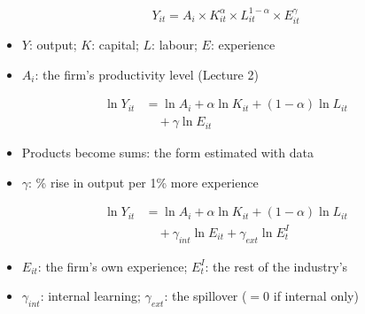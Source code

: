 \documentclass{beamer}
\begin{document}
\begin{frame}[plain,label=w3_production]
  \Large
  \[
    \tag{20}\;Y_{it} = A_i \times K_{it}^{\alpha} \times L_{it}^{1-\alpha} \times E_{it}^{\gamma}
  \]
  \vspace{0.3em}
  \begin{itemize}\Large
    \item $Y$: output; $K$: capital; $L$: labour; $E$: experience
    \item $A_i$: the firm's productivity level (Lecture 2)
  \end{itemize}
\end{frame}

\begin{frame}[plain,label=w3_production_log]
  \Large
  \begin{align*}
    \tag{21}\;\ln Y_{it} &= \ln A_i + \alpha \ln K_{it} + (1-\alpha) \ln L_{it}\\
                         &\quad + \gamma \ln E_{it}
  \end{align*}
  \vspace{0.2em}
  \begin{itemize}\Large
    \item Products become sums: the form estimated with data
    \item $\gamma$: \% rise in output per 1\% more experience
  \end{itemize}
\end{frame}

\begin{frame}[plain,label=w3_production_spill]
  \Large
  \begin{align*}
    \tag{22}\;\ln Y_{it} &= \ln A_i + \alpha \ln K_{it} + (1-\alpha) \ln L_{it}\\
                         &\quad + \gamma_{int} \ln E_{it} + \gamma_{ext} \ln E^{I}_{t}
  \end{align*}
  \vspace{0.2em}
  \begin{itemize}\Large
    \item $E_{it}$: the firm's own experience; $E^{I}_{t}$: the rest of the industry's
    \item $\gamma_{int}$: internal learning; $\gamma_{ext}$: the spillover ($= 0$ if internal only)
  \end{itemize}
\end{frame}
\end{document}
